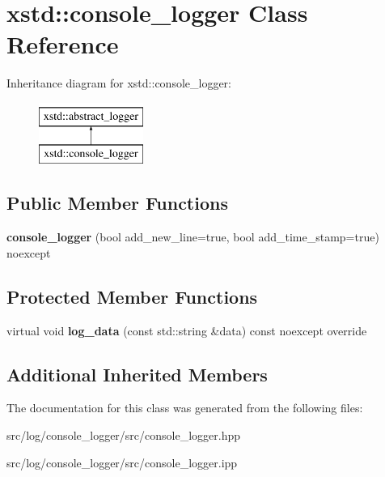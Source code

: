 \hypertarget{classxstd_1_1console__logger}{\section{xstd\-:\-:console\-\_\-logger Class Reference}
\label{classxstd_1_1console__logger}
}
Inheritance diagram for xstd\-:\-:console\-\_\-logger\-:\begin{figure}[H]
\begin{center}
\leavevmode
\includegraphics[height=2.000000cm]{classxstd_1_1console__logger}
\end{center}
\end{figure}
\subsection*{Public Member Functions}
\begin{DoxyCompactItemize}
\item 
\hypertarget{classxstd_1_1console__logger_a81ece8d9559e0ff0d54ad8d6cca596bc}{{\bfseries console\-\_\-logger} (bool add\-\_\-new\-\_\-line=true, bool add\-\_\-time\-\_\-stamp=true) noexcept}\label{classxstd_1_1console__logger_a81ece8d9559e0ff0d54ad8d6cca596bc}

\end{DoxyCompactItemize}
\subsection*{Protected Member Functions}
\begin{DoxyCompactItemize}
\item 
\hypertarget{classxstd_1_1console__logger_ad53afba0752b8cca7e5ccde101ec0954}{virtual void {\bfseries log\-\_\-data} (const std\-::string \&data) const noexcept override}\label{classxstd_1_1console__logger_ad53afba0752b8cca7e5ccde101ec0954}

\end{DoxyCompactItemize}
\subsection*{Additional Inherited Members}


The documentation for this class was generated from the following files\-:\begin{DoxyCompactItemize}
\item 
src/log/console\-\_\-logger/src/console\-\_\-logger.\-hpp\item 
src/log/console\-\_\-logger/src/console\-\_\-logger.\-ipp\end{DoxyCompactItemize}
